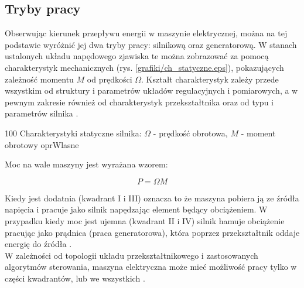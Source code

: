 \subsection{Tryby pracy}

Obserwując kierunek przepływu energii w maszynie elektrycznej, można na tej podstawie wyróżnić jej dwa tryby pracy: silnikową oraz generatorową. W stanach ustalonych układu napędowego zjawiska te można zobrazować za pomocą charakterystyk mechanicznych (rys. \ref{grafiki/ch_statyczne.eps}), pokazujących zależność momentu $ M $ od prędkości $ \Omega $. Kształt charakterystyk zależy przede wszystkim od struktury i parametrów układów regulacyjnych i pomiarowych, a w pewnym zakresie również od charakterystyk przekształtnika oraz od typu i parametrów silnika \cite{zawirski}.

	{100}
	{Charakterystyki statyczne silnika: $ \Omega $ - prędkość obrotowa, $ M $ - moment obrotowy}
	{oprWlasne}
	
Moc na wale maszyny jest wyrażana wzorem:

\begin{equation} \label{eq:chs1}
	P = \Omega M
\end{equation}

Kiedy jest dodatnia (kwadrant I i III) oznacza to że maszyna pobiera ją ze źródła napięcia i pracuje jako silnik napędzając element będący obciążeniem. W przypadku kiedy moc jest ujemna (kwadrant II i IV) silnik hamuje obciążenie pracując jako prądnica (praca generatorowa), która poprzez przekształtnik oddaje energię do źródła \cite{ecn_luty_2012}. \\

W zależności od topologii układu przekształtnikowego i zastosowanych algorytmów sterowania, maszyna elektryczna może mieć możliwość pracy tylko w części kwadrantów, lub we wszystkich . 








